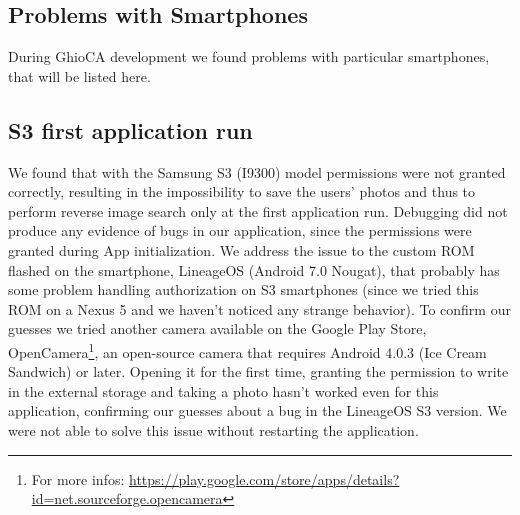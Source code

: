 \subsection{Problems with Smartphones}

During GhioCA development we found problems with particular smartphones, that
will be listed here.

\subsection{S3 first application run}

We found that with the Samsung S3 (I9300) model permissions were not granted
correctly, resulting in the impossibility to save the users' photos and thus to
perform reverse image search only at the first application run. Debugging did
not produce any evidence of bugs in our application, since the permissions were
granted during App initialization.
We address the issue to the custom ROM flashed on the smartphone, LineageOS
(Android 7.0 Nougat), that probably has some problem handling authorization on
S3 smartphones (since we tried this ROM on a Nexus 5 and we haven't noticed any
strange behavior).
To confirm our guesses we tried another camera available on the Google Play
Store, OpenCamera\footnote{For more infos:
\url{https://play.google.com/store/apps/details?id=net.sourceforge.opencamera}},
 an open-source camera that requires Android 4.0.3 (Ice Cream Sandwich) or
later.
Opening it for the first time, granting the permission to write in the external
storage and taking a photo hasn't worked even for this application, confirming
our guesses about a bug in the LineageOS S3 version.
We were not able to solve this issue without restarting the application.
